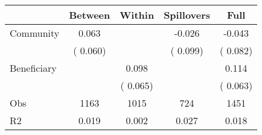 
\begin{tabular}{l*{4}{c}}\hline&\multicolumn{1}{c}{Between}&\multicolumn{1}{c}{Within}&\multicolumn{1}{c}{Spillovers}&\multicolumn{1}{c}{Full}\\ \hline
 Community             &              0.063      &                                               &       -0.026 &        -0.043                            \\ 
                               &        (       0.060)           &                                       &       (       0.099)     &      (       0.082)                                           \\ 
 Beneficiary   &                                               &        0.098    &                                &             0.114                            \\ 
                               &                                               & (       0.065)                  &                                        &      (       0.063)                                           \\ 
\hline                                                                                                                                                                                                                                            
 Obs                   &               1163               &       1015                       &       724                &              1451                                               \\ 
 R2                    &                      0.019              &              0.002                      &              0.027               &                     0.018                                              \\ 
\hline \end{tabular}                                                                                                                                                                                                              